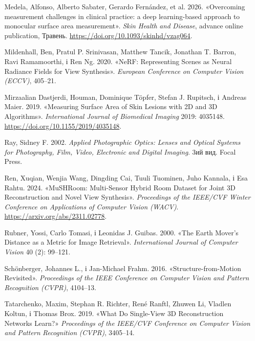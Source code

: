 \documentclass[
  ukrainian,
  10pt,
  a4paper,
  twocolumn]{article}
\newlength{\cslhangindent}
\newenvironment{CSLReferences}[2] %
 {\begin{list}{}{%
  \setlength{\itemindent}{0pt}
  \setlength{\leftmargin}{0pt}
  \setlength{\parsep}{0pt}
  \ifodd #1
   \setlength{\leftmargin}{\cslhangindent}
   \setlength{\itemindent}{-1\cslhangindent}
  \fi
  \setlength{\itemsep}{#2\baselineskip}}}
 {\end{list}}
\begin{document}
\begin{CSLReferences}{1}{1}
Medela, Alfonso, Alberto Sabater, Gerardo Fernández, et al. 2026.
{«Overcoming measurement challenges in clinical practice: a deep
learning-based approach to monocular surface area measurement»}.
\emph{Skin Health and Disease}, advance online publication, Травень.
\url{https://doi.org/10.1093/skinhd/vzag064}.

Mildenhall, Ben, Pratul P. Srinivasan, Matthew Tancik, Jonathan T.
Barron, Ravi Ramamoorthi, і Ren Ng. 2020. {«{NeRF}: Representing Scenes
as Neural Radiance Fields for View Synthesis»}. \emph{European
Conference on Computer Vision (ECCV)}, 405--21.

Mirzaalian Dastjerdi, Houman, Dominique Töpfer, Stefan J. Rupitsch, і
Andreas Maier. 2019. {«Measuring Surface Area of Skin Lesions with {2D}
and {3D} Algorithms»}. \emph{International Journal of Biomedical
Imaging} 2019: 4035148. \url{https://doi.org/10.1155/2019/4035148}.

Ray, Sidney F. 2002. \emph{Applied Photographic Optics: Lenses and
Optical Systems for Photography, Film, Video, Electronic and Digital
Imaging}. 3ий вид. Focal Press.

Ren, Xuqian, Wenjia Wang, Dingding Cai, Tuuli Tuominen, Juho Kannala, і
Esa Rahtu. 2024. {«{MuSHRoom}: Multi-Sensor Hybrid Room Dataset for
Joint {3D} Reconstruction and Novel View Synthesis»}. \emph{Proceedings
of the IEEE/CVF Winter Conference on Applications of Computer Vision
(WACV)}. \url{https://arxiv.org/abs/2311.02778}.

Rubner, Yossi, Carlo Tomasi, і Leonidas J. Guibas. 2000. {«The {Earth
Mover's Distance} as a Metric for Image Retrieval»}. \emph{International
Journal of Computer Vision} 40 (2): 99--121.

Schönberger, Johannes L., і Jan-Michael Frahm. 2016.
{«Structure-from-Motion Revisited»}. \emph{Proceedings of the IEEE
Conference on Computer Vision and Pattern Recognition (CVPR)}, 4104--13.

Tatarchenko, Maxim, Stephan R. Richter, René Ranftl, Zhuwen Li, Vladlen
Koltun, і Thomas Brox. 2019. {«What Do Single-View {3D} Reconstruction
Networks Learn?»} \emph{Proceedings of the IEEE/CVF Conference on
Computer Vision and Pattern Recognition (CVPR)}, 3405--14.


\end{CSLReferences}
\end{document}
